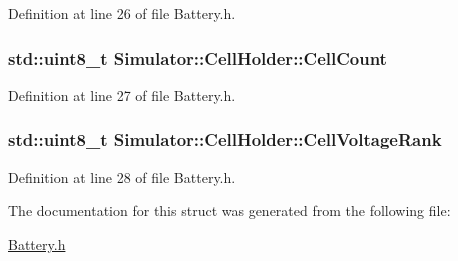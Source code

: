 Definition at line 26 of file Battery.\+h.

\hypertarget{struct_simulator_1_1_cell_holder_a4fbefa2b4bd016d751d61955c41d3e85}{}
\subsubsection[{Cell\+Count}]{\setlength{\rightskip}{0pt plus 5cm}std\+::uint8\+\_\+t Simulator\+::\+Cell\+Holder\+::\+Cell\+Count}\label{struct_simulator_1_1_cell_holder_a4fbefa2b4bd016d751d61955c41d3e85}


Definition at line 27 of file Battery.\+h.

\hypertarget{struct_simulator_1_1_cell_holder_a439559f5de39a0ebce5372f2d207702f}{}
\subsubsection[{Cell\+Voltage\+Rank}]{\setlength{\rightskip}{0pt plus 5cm}std\+::uint8\+\_\+t Simulator\+::\+Cell\+Holder\+::\+Cell\+Voltage\+Rank}\label{struct_simulator_1_1_cell_holder_a439559f5de39a0ebce5372f2d207702f}


Definition at line 28 of file Battery.\+h.



The documentation for this struct was generated from the following file\+:\begin{DoxyCompactItemize}
\item 
\hyperlink{_battery_8h}{Battery.\+h}\end{DoxyCompactItemize}

